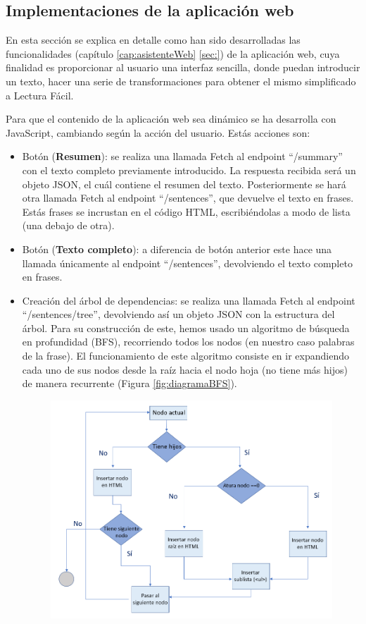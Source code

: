\subsection{Implementaciones de la aplicación web}

En esta sección se explica en detalle como han sido desarrolladas las funcionalidades (capítulo \ref{cap:asistenteWeb} \ref{sec:}) de la aplicación web, cuya finalidad es proporcionar al usuario una interfaz sencilla, donde puedan introducir un texto, hacer una serie de transformaciones para obtener el mismo simplificado a Lectura Fácil.


Para que el contenido de la aplicación web sea dinámico se ha desarrolla con JavaScript, cambiando según la acción del usuario. Estás acciones son:

\begin{itemize}
	\item Botón (\textbf{Resumen}): se realiza una llamada Fetch al endpoint ``/summary'' con el texto completo previamente introducido. La respuesta recibida será un objeto JSON, el cuál contiene el resumen del texto. Posteriormente se hará otra llamada Fetch al endpoint ``/sentences'', que devuelve el texto en frases. Estás frases se incrustan en el código HTML, escribiéndolas a modo de lista (una debajo de otra).    
 
	\item Botón (\textbf{Texto completo}): a diferencia de botón anterior este hace una llamada únicamente al endpoint ``/sentences'', devolviendo el texto completo en frases.

	\item Creación del árbol de dependencias: se realiza una llamada Fetch al endpoint ``/sentences/tree'', devolviendo así un objeto JSON con la estructura del árbol. Para su construcción de este, hemos usado un algoritmo de búsqueda en profundidad (BFS), recorriendo todos los nodos (en nuestro caso palabras de la frase). El funcionamiento de este algoritmo consiste en ir expandiendo cada uno de sus nodos desde la raíz hacia el nodo hoja (no tiene más hijos) de manera recurrente (Figura \ref{fig:diagramaBFS}).
	\begin{figure}[h!]
		\centering
		
		
		\includegraphics[scale=1]{Imagenes/Figuras/diagramaBFS}
		

\end{figure}
\end{itemize}
